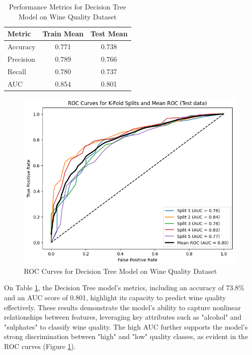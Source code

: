 \documentclass[conference]{IEEEtran}
\begin{document}
\begin{table}[h]
  \centering
  \caption{Performance Metrics for Decision Tree Model on Wine Quality Dataset}
  \label{tab:dt_wine}
  \begin{tabular}{|l|c|c|}
  \hline
  \textbf{Metric}         & \textbf{Train Mean} & \textbf{Test Mean} \\ \hline
  Accuracy                & 0.771               & 0.738              \\ \hline
  Precision               & 0.789               & 0.766              \\ \hline
  Recall                  & 0.780               & 0.737              \\ \hline
  AUC                     & 0.854               & 0.801              \\ \hline
  \end{tabular}
  \end{table}

  \begin{figure}[h]
    \centering
    \includegraphics[width=\columnwidth]{plots/dt_wine_ROC_curves.png}
    \caption{ROC Curves for Decision Tree Model on Wine Quality Dataset}
    \label{fig:dt_roc_wine}
  \end{figure}


On Table \ref{tab:dt_wine}, the Decision Tree model's metrics, including an accuracy of 73.8\% and an AUC score of 0.801, highlight its capacity to predict wine quality effectively. These results demonstrate the model's ability to capture nonlinear relationships between features, leveraging key attributes such as "alcohol" and "sulphates" to classify wine quality. The high AUC further supports the model’s strong discrimination between "high" and "low" quality classes, as evident in the ROC curves (Figure \ref{fig:dt_roc_wine}).
\end{document}
